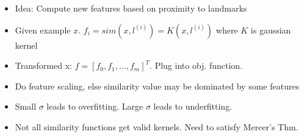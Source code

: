 \documentclass{article}
\begin{document}
\begin{multicols*}{3}
\begin{itemize}
    \item Idea: Compute new features based on proximity to landmarks
    \item Given example $x$. $f_i = sim (x, l^{(i)}) = K(x, l^{(i)})$ where $K$ is gaussian kernel
    \item Transformed x: $f = [f_0, f_1, \dots, f_m]^T$. Plug into obj. function.
    \item Do feature scaling, else similarity value may be dominated by some features
    \item Small $\sigma$ leads to overfitting. Large $\sigma$ leads to underfitting.
    \item Not all similarity functions get valid kernels. Need to satisfy Mercer's Thm.
\end{itemize}

\end{multicols*}
\end{document}
